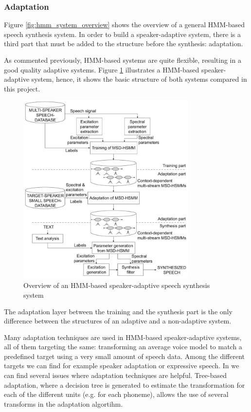 \subsubsection{Adaptation}
\label{hmm_synthesis_adaptation}
Figure \ref{fig:hmm_system_overview} shows the overview of a general HMM-based speech synthesis system.
%
In order to build a speaker-adaptive system, there is a third part that must be added to the structure before the synthesis: adaptation.

As commented previously, HMM-based systems are quite flexible, resulting in a good quality adaptive systems.
%
Figure \ref{fig:hmm_system_adapt_overview} illustrates a HMM-based speaker-adaptive system, hence, it shows the basic structure of both systems compared in this project.

\begin{figure}[!htb]
\begin{centering}
\includegraphics[width=0.8\textwidth]{images/hmm_based_system_adapt_overview.jpg}
\caption{Overview of an HMM-based speaker-adaptive speech synthesis system \cite{yamagishi2009}}
\label{fig:hmm_system_adapt_overview}
\end{centering}
\end{figure}

The adaptation layer between the training and the synthesis part is the only difference between the structures of an adaptive and a non-adaptive system.
%

Many adaptation techniques are used in HMM-based speaker-adaptive systems, all of them targeting the same: transforming an average voice model to match a predefined target using a very small amount of speech data.
%
Among the different targets we can find for example speaker adaptation or expressive speech.
%
In \cite{tokuda13} we can find several issues where adaptation techniques are helpful.
%
Tree-based adaptation, where a decision tree is generated to estimate the transformation for each of the different units (e.g. for each phoneme), allows the use of several transforms in the adaptation algortihm.

